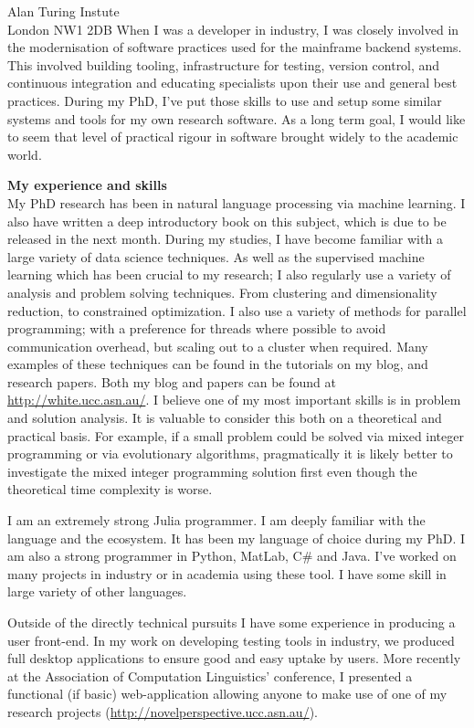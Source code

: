 \documentclass[]{letter}
\newcommand{\section}[1]{\textbf{#1}\\}
\begin{document}
\begin{letter}{Alan Turing Instute\\London NW1 2DB}
When I was a developer in industry, I was closely involved in the modernisation of software practices used for the mainframe backend systems.
This involved building tooling, infrastructure for testing, version control, and continuous integration and educating specialists upon their use and general best practices.
During my PhD, I've put those skills to use and setup some similar systems and tools for my own research software.
As a long term goal, I would like to seem that level of practical rigour in software brought widely to the academic world.


\section{My experience and skills}


My PhD research has been in natural language processing via machine learning.
I also have written a deep introductory book on this subject, which is due to be released in the next month.
During my studies, I have become familiar with a large variety of data science techniques.
As well as the supervised machine learning which has been crucial to my research;
I also regularly use a variety of analysis and problem solving techniques.
From clustering and dimensionality reduction, to constrained optimization.
I also use a variety of methods for parallel programming; with a preference for threads where possible to avoid communication overhead, but scaling out to a cluster when required.
Many examples of these techniques can be found in the tutorials on my blog, and research papers.
Both my blog and papers can be found at \url{http://white.ucc.asn.au/}.
I believe one of my most important skills is in problem and solution analysis.
It is valuable to consider this both on a theoretical and practical basis.
For example, if a small problem could be solved via mixed integer programming
or via evolutionary algorithms, pragmatically it is likely better to investigate the mixed integer programming solution first even though the theoretical time complexity is worse.


I am an extremely strong Julia programmer.
I am deeply familiar with the language and the ecosystem.
It has been my language of choice during my PhD.
I am also a strong programmer in Python, MatLab, C\# and Java.
I've worked on many projects in industry or in academia using these tool.
I have some skill in large variety of other languages.

Outside of the directly technical pursuits I have some experience in producing a user front-end.
In my work on developing testing tools in industry, we produced full desktop applications to ensure good and easy uptake by users.
More recently at the Association of Computation Linguistics' conference, I presented 
a functional (if basic) web-application allowing anyone to make use of one of my research projects (\url{http://novelperspective.ucc.asn.au/}).


\end{letter}
\end{document}
